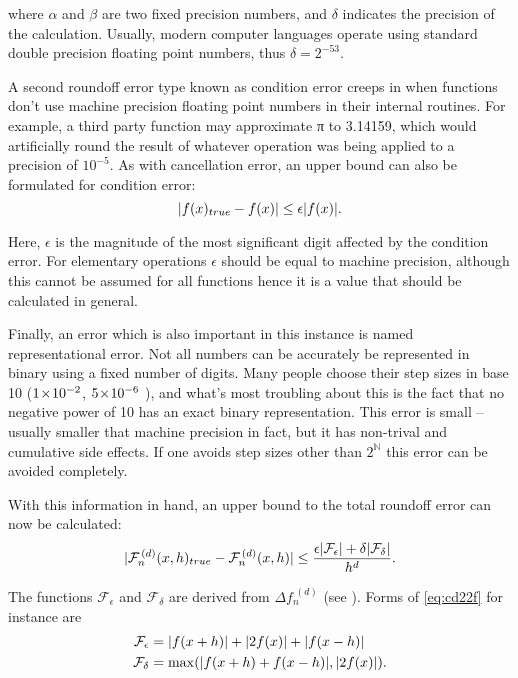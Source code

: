 where $\alpha$ and $\beta$ are two fixed precision numbers, and $\delta$ indicates the precision of the calculation.
Usually, modern computer languages operate using standard double precision floating point numbers, thus $\delta = 2^{-53}$.

A second roundoff error type known as condition error creeps in when functions don't use machine precision floating point numbers in their internal routines.
For example, a third party function may approximate π to 3.14159, which would artificially round the result of whatever operation was being applied to a precision of $10^{-5}$.
As with cancellation error, an upper bound can also be formulated for condition error:
\begin{equation}
\lvert f(x)_{true} - f(x)\rvert\leq \epsilon \lvert f(x)\rvert.
\end{equation}

Here, $\epsilon$ is the magnitude of the most significant digit affected by the condition error.
For elementary operations $\epsilon$ should be equal to machine precision, although this cannot be assumed for all functions hence it is a value that should be calculated in general.

Finally, an error which is also important in this instance is named representational error.
Not all numbers can be accurately be represented in binary using a fixed number of digits.
Many people choose their step sizes in base 10 (\eg $1\!\times\!10^{-2}$, $5\!\times\!10^{-6}$ \etc), and what's most troubling about this is the fact that no negative power of 10 has an exact binary representation.
This error is small -- usually smaller that machine precision in fact, but it has non-trival and cumulative side effects.
If one avoids step sizes other than $2^\mathbb{N}$ this error can be avoided completely.

With this information in hand, an upper bound to the total roundoff error can now be calculated:
\begin{equation}
 \lvert\mathcal{F}_n^{\,(d)}(x,h)_{true}-\mathcal{F}_n^{\,(d)}(x,h)\rvert \leq \frac{\epsilon\lvert\mathcal{F}_\epsilon\rvert+\delta\lvert\mathcal{F}_\delta\rvert}{h^d}.
\end{equation}

The functions $\mathcal{F}_\epsilon$ and $\mathcal{F}_\delta$ are derived from $\Delta f_n^{\;(d)}$ (see ).
Forms of \cref{eq:cd22f} for instance are
\begin{align}
\mathcal{F}_\epsilon &= \lvert f(x+h)\rvert + \lvert2f(x)\rvert + \lvert f(x-h)\rvert \\
\mathcal{F}_\delta &= \max(\lvert f(x+h) + f(x-h)\rvert,\lvert2f(x)\rvert).
\end{align}

